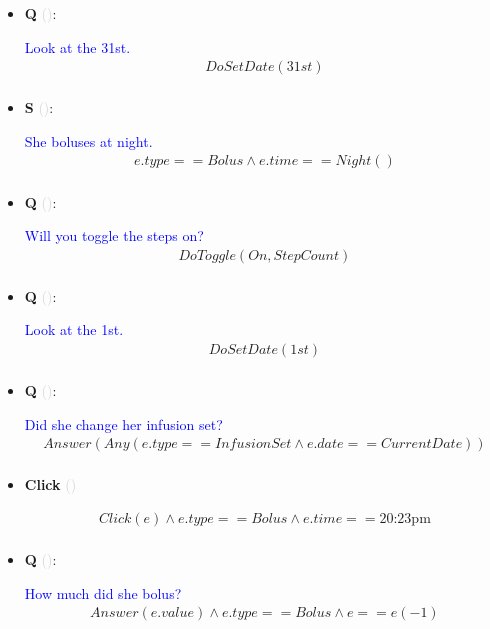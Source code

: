 \documentclass[11pt]{article}
\newcounter{CQ}
\newcounter{CS}
\newcounter{CClick}
\newcommand{\key}[1]{\textcolor{lightgray}{#1}}
\begin{document}
\begin{itemize}
	
	\item
	\textbf{Q\theCQ} \key{()}: \addtocounter{CQ}{1}
	\textcolor{blue}{ Look at the 31st. }
	\begin{multline*}
	DoSetDate(31st) \\
	\end{multline*}
	
	\item
	\textbf{S\theCS} \key{()}: \addtocounter{CS}{1}
	\textcolor{blue}{ She boluses at night. }
	\begin{multline*}
	e.type==Bolus \wedge e.time==Night() \\
	\end{multline*}
	
	
	\item
	\textbf{Q\theCQ} \key{()}: \addtocounter{CQ}{1}
	\textcolor{blue}{ Will you toggle the steps on? }
	\begin{multline*}
	DoToggle(On, StepCount) \\
	\end{multline*}
	
	
	\item
	\textbf{Q\theCQ} \key{()}: \addtocounter{CQ}{1}
	\textcolor{blue}{ Look at the 1st. }
	\begin{multline*}
	DoSetDate(1st) \\
	\end{multline*}
	

	\item
	\textbf{Q\theCQ} \key{()}: \addtocounter{CQ}{1}
	\textcolor{blue}{ Did she change her infusion set? }
	\begin{multline*}
	Answer(Any(e.type==InfusionSet \wedge e.date==CurrentDate)) \\
	\end{multline*}
	
	\item
	\textbf{Click\theCClick} \key{()} \addtocounter{CClick}{1}
	\begin{multline*}
	Click(e) \wedge e.type == Bolus \wedge e.time == \mbox{20:23pm} \\
	\end{multline*}
	
	\item
	\textbf{Q\theCQ} \key{()}: \addtocounter{CQ}{1}
	\textcolor{blue}{ How much did she bolus? }
	\begin{multline*}
	Answer(e.value) \wedge e.type == Bolus \wedge e==e(-1) \\
	\end{multline*}
	

\end{itemize}
\end{document}
